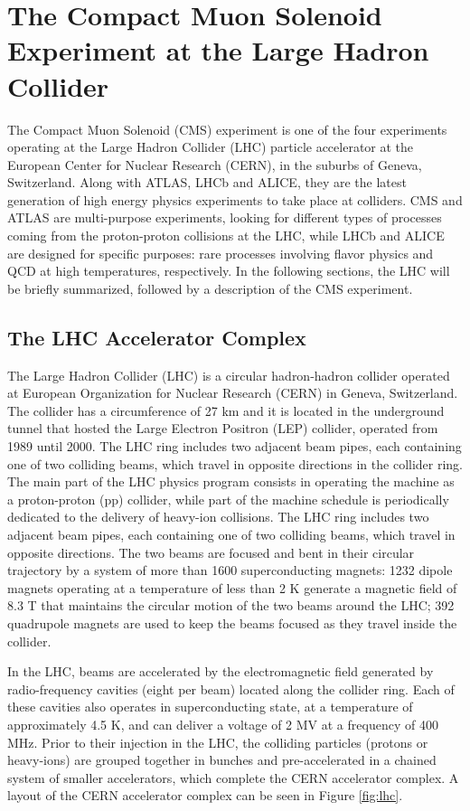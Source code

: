 \chapter{The Compact Muon Solenoid Experiment at the Large Hadron Collider}
\graphicspath{{cms/figures/}{cms/}}

The Compact Muon Solenoid (CMS) experiment is one of the four experiments operating at the Large Hadron Collider (LHC) particle accelerator at the European Center for Nuclear Research (CERN), in the suburbs of Geneva, Switzerland. 
Along with ATLAS, LHCb and ALICE, they are the latest generation of high energy physics experiments to take place at colliders. 
CMS and ATLAS are multi-purpose experiments, looking for different types of processes coming from the proton-proton collisions at the LHC, while LHCb and ALICE are designed for specific purposes: rare processes involving flavor physics and QCD at high temperatures, respectively.  
In the following sections, the LHC will be briefly summarized, followed by a description of the CMS experiment.

\section{The LHC Accelerator Complex}

The Large Hadron Collider (LHC) is a circular hadron-hadron collider operated at European Organization for Nuclear Research (CERN) in Geneva, Switzerland. 
The collider has a circumference of 27 km and it is located in the underground tunnel that hosted the Large Electron Positron (LEP) collider, operated from 1989 until 2000. 
The LHC ring includes two adjacent beam pipes, each containing one of two colliding beams, which travel in opposite directions in the collider ring. 
The main part of the LHC physics program consists in operating the machine as a proton-proton (pp) collider, while part of the machine schedule is periodically dedicated to the delivery of heavy-ion collisions. 
The LHC ring includes two adjacent beam pipes, each containing one of two colliding beams, which travel in opposite directions. 
The two beams are focused and bent in their circular trajectory by a system of more than 1600 superconducting magnets: 
1232 dipole magnets operating at a temperature of less than 2 K generate a magnetic field of 8.3 T that maintains the circular motion of the two beams around the LHC; 
392 quadrupole magnets are used to keep the beams focused as they travel inside the collider. 

In the LHC, beams are accelerated by the electromagnetic field generated by radio-frequency cavities (eight per beam) located along the collider ring. 
Each of these cavities also operates in superconducting state, at a temperature of approximately 4.5 K, and can deliver a voltage of 2 MV at a frequency of 400 MHz. 
Prior to their injection in the LHC, the colliding particles (protons or heavy-ions) are grouped together in bunches and pre-accelerated in a chained system of smaller accelerators, which complete the CERN accelerator complex. 
A layout of the CERN accelerator complex can be seen in Figure \ref{fig:lhc}.

